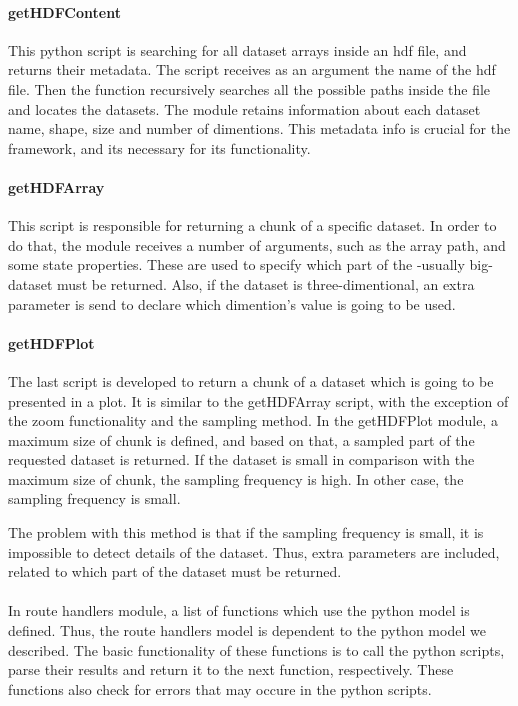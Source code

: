 \paragraph{getHDFContent}
This python script is searching for all dataset arrays inside an hdf file, and returns their metadata. The script receives as an argument the name of the hdf file. Then the function recursively searches all the possible paths inside the file and locates the datasets. The module retains information about each dataset name, shape, size and number of dimentions. This metadata info is crucial for the framework, and its necessary for its functionality.

\paragraph{getHDFArray}
This script is responsible for returning a chunk of a specific dataset. In order to do that, the module receives a number of arguments, such as the array path, and some state properties. These are used to specify which part of the -usually big- dataset must be returned. Also, if the dataset is three-dimentional, an extra parameter is send to declare which dimention's value is going to be used.

\paragraph{getHDFPlot}
The last script is developed to return a chunk of a dataset which is going to be presented in a plot. It is similar to the getHDFArray script, with the exception of the zoom functionality and the sampling method. In the getHDFPlot module, a maximum size of chunk is defined, and based on that, a sampled part of the requested dataset is returned. If the dataset is small in comparison with the maximum size of chunk, the sampling frequency is high. In other case, the sampling frequency is small. \par 
	The problem with this method is that if the sampling frequency is small, it is impossible to detect details of the dataset. Thus, extra parameters are included, related to which part of the dataset must be returned.
	
\paragraph{}
In route handlers module, a list of functions which use the python model is defined. Thus, the route handlers model is dependent to the python model we described. The basic functionality of these functions is to call the python scripts, parse their results and return it to the next function, respectively. These functions also check for errors that may occure in the python scripts. 


